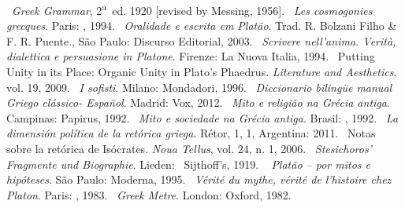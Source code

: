 \begin{bibliohedra}
~\emph{Greek Grammar}, 2\textsuperscript{a}~ed. 1920
  [revised by Messing, 1956].
~\emph{Les cosmogonies grecques}. Paris: , 1994.
~\emph{Oralidade e escrita em Platão}. Trad. R. Bolzani
  Filho \& F. R. Puente., São Paulo: Discurso Editorial, 2003.
~\emph{Scrivere nell'anima. Verità, dialettica e
  persuasione in Platone}. Firenze: La Nuova Italia, 1994.
~Putting Unity in its Place: Organic Unity in
  Plato's Phaedrus. \emph{Literature and Aesthetics}, vol. 19, 2009.
~\emph{I sofisti}. Milano: Mondadori, 1996.
~\emph{Diccionario bilingüe manual Griego clássico-
  Español}. Madrid: Vox, 2012.
~\emph{Mito e religião na Grécia antiga}. Campinas:
  Papirus, 1992.
~\emph{Mito e sociedade na Grécia antiga}. Brasil: ,
  1992.
~\emph{La dimensión política de la retórica griega}.
  Rétor, 1, 1, Argentina: 2011.
~Notas sobre la retórica de Isócrates. \emph{Noua Tellus},
  vol. 24, n. 1, 2006.
~\emph{Stesichoros' Fragmente und Biographie}. Lieden:
  ~Sijthoff's, 1919.
~\emph{ Platão -- por mitos e hipóteses}. São Paulo:
  Moderna, 1995.
~\emph{Vérité du mythe, vérité de l'histoire chez
  Platon}. Paris: , 1983.
~\emph{Greek Metre}. London: Oxford, 1982.
\end{bibliohedra}

